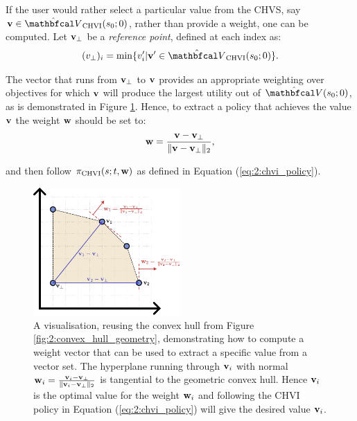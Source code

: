         If the user would rather select a particular value from the CHVS, say $\bff{v}\in\Vchvi(s_0;0)$, rather than provide a weight, one can be computed. Let $\mathbf{v}_\bot$ be a \textit{reference point}, defined at each index as:
        \begin{align}
            (v_{\bot})_i = \min \{v'_i | \bff{v}'\in\Vchvi(s_0;0) \}. \label{eq:2:chvi_ref_point}
        \end{align} 

        The vector that runs from $\mathbf{v}_\bot$ to $\mathbf{v}$ provides an appropriate weighting over objectives for which $\mathbf{v}$ will produce the largest utility out of $\hat{\bfcl{V}}(s_0;0)$, as is demonstrated in Figure \ref{fig:2:convex_hull_extract_policy_weight}. Hence, to extract a policy that achieves the value $\mathbf{v}$ the weight $\mathbf{w}$ should be set to:
        \begin{align}
            \mathbf{w} = \frac{\mathbf{v}-\mathbf{v}_\bot}{\Vert\mathbf{v}-\mathbf{v}_\bot\Vert_2}, \label{eq:2:chvi_extract_value_weight}
        \end{align}

        and then follow ${\pi_{{\textnormal{CHVI}}}}(s;t,\mathbf{w})$ as defined in Equation (\ref{eq:2:chvi_policy}).
        
        \begin{figure}
            \centering\includegraphics[width=0.5\textwidth]{figures/ch2/ch_extract_policy_weight.pdf} 
            \caption[A visualisation, reusing the convex hull from Figure \ref{fig:2:convex_hull_geometry}, demonstrating how to compute a weight vector that can be used to extract a specific value from a vector set.]{A visualisation, reusing the convex hull from Figure \ref{fig:2:convex_hull_geometry}, demonstrating how to compute a weight vector that can be used to extract a specific value from a vector set. The hyperplane running through $\mathbf{v}_i$ with normal $\mathbf{w}_i=\frac{\mathbf{v}_i-\mathbf{v}_\bot}{\Vert\mathbf{v}_i-\mathbf{v}_\bot\Vert_2}$ is tangential to the geometric convex hull. Hence $\mathbf{v}_i$ is the optimal value for the weight $\mathbf{w}_i$ and following the CHVI policy in Equation (\ref{eq:2:chvi_policy}) will give the desired value $\mathbf{v}_i$.}
            \label{fig:2:convex_hull_extract_policy_weight} 
        \end{figure}











